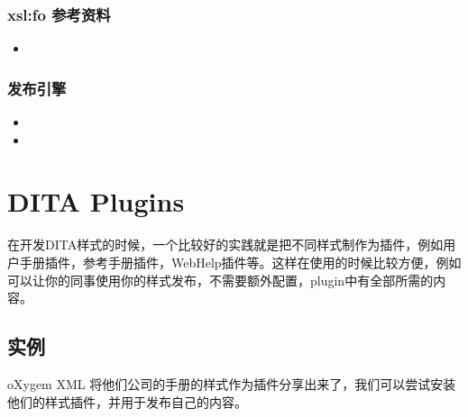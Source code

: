 \documentclass[letterpaper,10pt,english]{sphinxmanual}
\begin{document}
\subsection{xsl:fo 参考资料}
\label{\detokenize{formatting/XSL-FO:id6}}\begin{itemize}
\item {} 
\sphinxAtStartPar
{}

\end{itemize}


\subsection{发布引擎}
\label{\detokenize{formatting/XSL-FO:id7}}\begin{itemize}
\item {} 
\sphinxAtStartPar
{}

\item {} 
\sphinxAtStartPar
{}

\end{itemize}

\sphinxstepscope


\chapter{DITA Plugins}
\label{\detokenize{formatting/dita-plugins:dita-plugins}}\label{\detokenize{formatting/dita-plugins::doc}}
\sphinxAtStartPar
在开发DITA样式的时候，一个比较好的实践就是把不同样式制作为插件，例如用户手册插件，参考手册插件，WebHelp插件等。这样在使用的时候比较方便，例如可以让你的同事使用你的样式发布，不需要额外配置，plugin中有全部所需的内容。


\section{实例}
\label{\detokenize{formatting/dita-plugins:id1}}
\sphinxAtStartPar
oXygem XML 将他们公司的手册的样式作为插件分享出来了，我们可以尝试安装他们的样式插件，并用于发布自己的内容。
\end{document}
